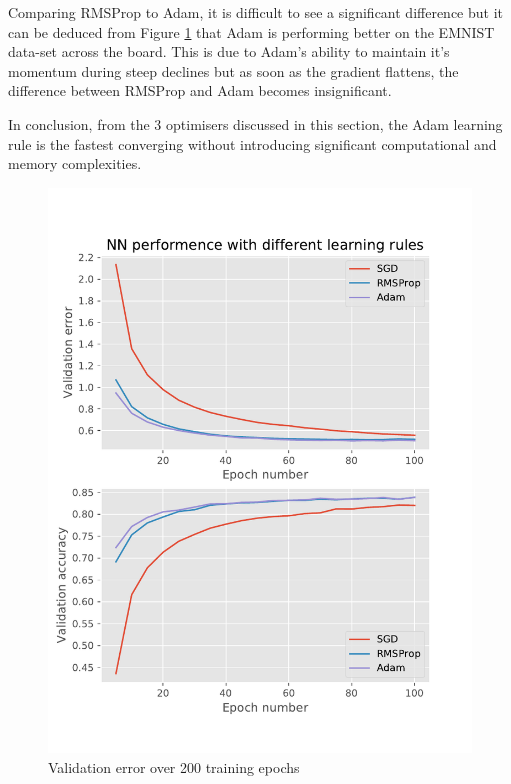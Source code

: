 \documentclass{article}
\begin{document}
Comparing RMSProp to Adam, it is difficult to see a significant difference but it can be deduced from Figure \ref{fig:ex2_compraison} that Adam is performing better on the EMNIST data-set across the board. This is due to Adam's ability to maintain it's momentum during steep declines but as soon as the gradient flattens, the difference between RMSProp and Adam becomes insignificant.

In conclusion, from the 3 optimisers discussed in this section, the Adam learning rule is the fastest converging without introducing significant computational and memory complexities.

\begin{figure}[tb]
\begin{center}
\centerline{\includegraphics[width=\columnwidth]{ex2_comparison.pdf}}
\caption{Validation error over 200 training epochs}
\label{fig:ex2_compraison}
\end{center}
\end{figure} 
\end{document}
